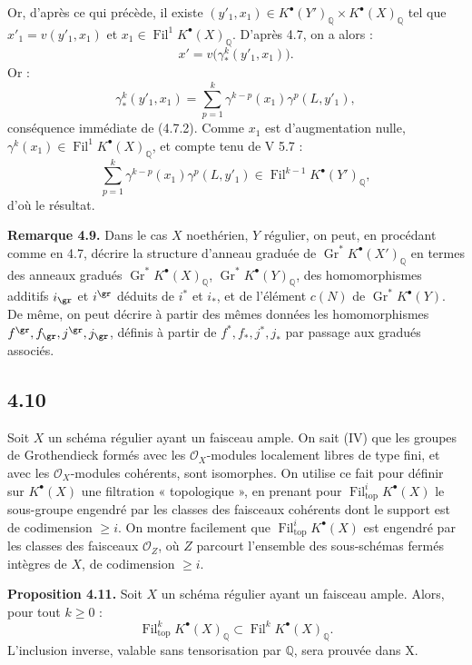 \documentclass[11pt]{article}
\newcommand{\Fil}{\operatorname{Fil}}
\begin{document}
Or, d'après ce qui précède, il existe \((y'_1,x_1)\in K^\bullet(Y')_{\mathbb Q}\times K^\bullet(X)_{\mathbb Q}\) tel que \(x'_1=v(y'_1,x_1)\) et \(x_1\in\Fil^1K^\bullet(X)_{\mathbb Q}\). D'après 4.7, on a alors :
\[
  x'=v\bigl(\gamma^k_*(y'_1,x_1)\bigr).
\]
Or :
\[
  \gamma^k_*(y'_1,x_1)
  =
  \sum_{p=1}^{k}\gamma^{k-p}(x_1)\gamma^p(L,y'_1),
\]
conséquence immédiate de (4.7.2). Comme \(x_1\) est d'augmentation nulle, \(\gamma^k(x_1)\in\Fil^1K^\bullet(X)_{\mathbb Q}\), et compte tenu de V 5.7 :
\[
  \sum_{p=1}^{k}\gamma^{k-p}(x_1)\gamma^p(L,y'_1)
  \in\Fil^{k-1}K^\bullet(Y')_{\mathbb Q},
\]
d'où le résultat.

\textbf{Remarque 4.9.} Dans le cas \(X\) noethérien, \(Y\) régulier, on peut, en procédant comme en 4.7, décrire la structure d'anneau graduée de \(\operatorname{Gr}^*K^\bullet(X')_{\mathbb Q}\) en termes des anneaux gradués \(\operatorname{Gr}^*K^\bullet(X)_{\mathbb Q}\), \(\operatorname{Gr}^*K^\bullet(Y)_{\mathbb Q}\), des homomorphismes additifs \(i_{\gr}\) et \(i^{\gr}\) déduits de \(i^*\) et \(i_*\), et de l'élément \(c(N)\) de \(\operatorname{Gr}^*K^\bullet(Y)\). De même, on peut décrire à partir des mêmes données les homomorphismes \(f^{\gr},f_{\gr},j^{\gr},j_{\gr}\), définis à partir de \(f^*,f_*,j^*,j_*\) par passage aux gradués associés.

\subsection*{4.10}

Soit \(X\) un schéma régulier ayant un faisceau ample. On sait (IV) que les groupes de Grothendieck formés avec les \(\mathcal O_X\)-modules localement libres de type fini, et avec les \(\mathcal O_X\)-modules cohérents, sont isomorphes. On utilise ce fait pour définir sur \(K^\bullet(X)\) une filtration « topologique », en prenant pour \(\Fil^i_{\mathrm{top}}K^\bullet(X)\) le sous-groupe engendré par les classes des faisceaux cohérents dont le support est de codimension \(\ge i\). On montre facilement que \(\Fil^i_{\mathrm{top}}K^\bullet(X)\) est engendré par les classes des faisceaux \(\mathcal O_Z\), où \(Z\) parcourt l'ensemble des sous-schémas fermés intègres de \(X\), de codimension \(\ge i\).

\textbf{Proposition 4.11.} Soit \(X\) un schéma régulier ayant un faisceau ample. Alors, pour tout \(k\ge0\) :
\[
  \Fil_{\mathrm{top}}^kK^\bullet(X)_{\mathbb Q}
  \subset
  \Fil^kK^\bullet(X)_{\mathbb Q}.
\]
L'inclusion inverse, valable sans tensorisation par \(\mathbb Q\), sera prouvée dans X.
\end{document}
